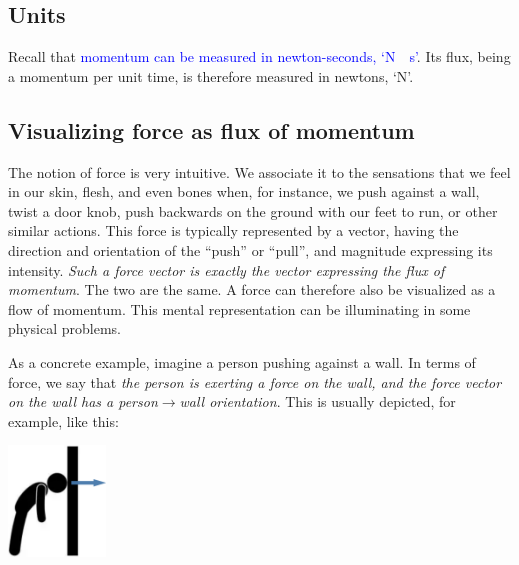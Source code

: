 \documentclass[a4paper,12pt,%
onecolumn,oneside,titlepage,%
british%
]{memoir}
\renewcommand*{\|}[1][]{\nonscript\:#1\vert\nonscript\:\mathopen{}}
\newcommand*{\sect}{\S}%
\renewcommand*{\autoref}[2]{\sidepar{\vspace{-1ex}\footnotesize{\color{blue}\faIcon{%
reply%
}\enspace\sect\,\ref{#1} page\,\pageref{#1}}}\textcolor{blue}{#2}}
\begin{document}
\subsection{Units}
\label{sec:units_momflux}

Recall that \autoref{sec:intro_momentum}{momentum can be measured in newton-seconds, \enquote*{\unit{N\cdot s}}}. Its flux, being a momentum per unit time, is therefore measured in newtons, \enquote*{\unit{N}}.

\subsection{Visualizing force as flux of momentum}
\label{sec:visualize_force}

The notion of force is very intuitive. We associate it to the sensations that we feel in our skin, flesh, and even bones when, for instance, we push against a wall, twist a door knob, push backwards on the ground with our feet to run, or other similar actions. This force is typically represented by a vector, having the direction and orientation of the \enquote{push} or \enquote{pull}, and magnitude expressing its intensity. \emph{Such a force vector is exactly the vector expressing the flux of momentum}. The two are the same. A force can therefore also be visualized as a flow of momentum. This mental representation can be illuminating in some physical problems.

As a concrete example, imagine a person pushing against a wall. In terms of force, we say that \emph{the person is exerting a force on the wall,
  and the force vector on the wall has a person$\rightarrow$wall orientation}. This is usually depicted, for example, like this:%
\begin{center}
    \includegraphics[height=8em]{images/person_push_force.pdf}
\end{center}
\end{document}
